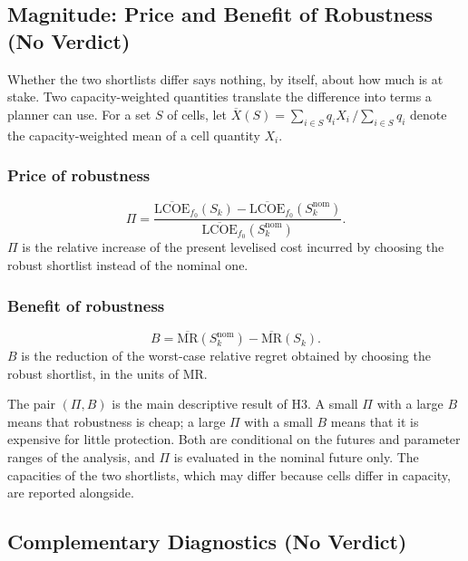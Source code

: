 \subsection{Magnitude: Price and Benefit of Robustness (No Verdict)}
\label{subsec:h3_magnitude}

Whether the two shortlists differ says nothing, by itself, about how much is at
stake. Two capacity-weighted quantities translate the difference into terms a
planner can use. For a set $S$ of cells, let
$\overline{X}(S)=\sum_{i\in S}q_iX_i\,/\sum_{i\in S}q_i$ denote the
capacity-weighted mean of a cell quantity $X_i$.

\subsubsection{Price of robustness}

\begin{equation}
    \Pi=\frac{\overline{\mathrm{LCOE}}_{f_0}(S_k)
    -\overline{\mathrm{LCOE}}_{f_0}(S^{\mathrm{nom}}_k)}
    {\overline{\mathrm{LCOE}}_{f_0}(S^{\mathrm{nom}}_k)}.
    \label{eq:h3_price}
\end{equation}
$\Pi$ is the relative increase of the present levelised cost incurred by
choosing the robust shortlist instead of the nominal one.

\subsubsection{Benefit of robustness}

\begin{equation}
    B=\overline{\mathrm{MR}}(S^{\mathrm{nom}}_k)-\overline{\mathrm{MR}}(S_k).
    \label{eq:h3_benefit}
\end{equation}
$B$ is the reduction of the worst-case relative regret obtained by choosing the
robust shortlist, in the units of $\mathrm{MR}$.

The pair $(\Pi,B)$ is the main descriptive result of H3. A small $\Pi$ with a
large $B$ means that robustness is cheap; a large $\Pi$ with a small $B$ means
that it is expensive for little protection. Both are conditional on the futures
and parameter ranges of the analysis, and $\Pi$ is evaluated in the nominal
future only. The capacities of the two shortlists, which may differ because cells
differ in capacity, are reported alongside.

\subsection{Complementary Diagnostics (No Verdict)}
\label{subsec:h3_diagnostics}

